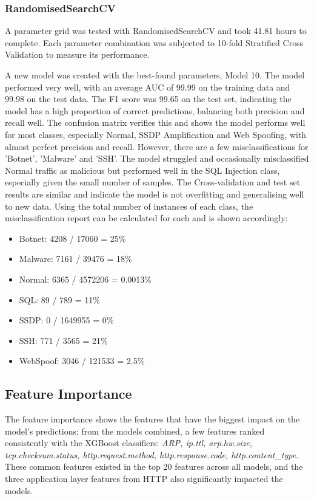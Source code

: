 \subsubsection*{RandomisedSearchCV}

\medskip

A parameter grid was tested with RandomisedSearchCV and took 41.81 hours to complete. Each parameter combination was subjected to 10-fold Stratified Cross Validation to measure its performance. 

A new model was created with the best-found parameters, Model 10. The model performed very well, with an average AUC of 99.99 on the training data and 99.98 on the test data. The F1 score was 99.65 on the test set, indicating the model has a high proportion of correct predictions, balancing both precision and recall well. The confusion matrix verifies this and shows the model performs well for most classes, especially Normal, SSDP Amplification and Web Spoofing, with almost perfect precision and recall. However, there are a few misclassifications for 'Botnet', 'Malware' and 'SSH'. The model struggled and occasionally misclassified Normal traffic as malicious but performed well in the SQL Injection class, especially given the small number of samples. The Cross-validation and test set results are similar and indicate the model is not overfitting and generalising well to new data. 
Using the total number of instances of each class, the misclassification report can be calculated for each and is shown accordingly:

\begin{itemize}
	\item Botnet: 4208 / 17060 = {\color{red} 25\%}
	\item Malware: 7161 / 39476 = 18\%
	\item Normal: 6365 / 4572206 = 0.0013\%
	\item SQL: 89 / 789 = 11\%
	\item SSDP: 0 / 1649955 = {\color{mygreen} 0\%}
	\item SSH: 771 / 3565 = 21\%
	\item WebSpoof: 3046 / 121533 = 2.5\%
\end{itemize}

\subsection*{Feature Importance}

The feature importance shows the features that have the biggest impact on the model's predictions; from the models combined, a few features ranked consistently with the XGBoost classifiers: \textit{ARP, ip.ttl, arp.hw.size, tcp.checksum.status, http.request.method, http.response.code, http.content\_type}. These common features existed in the top 20 features across all models, and the three application layer features from HTTP also significantly impacted the models. 

